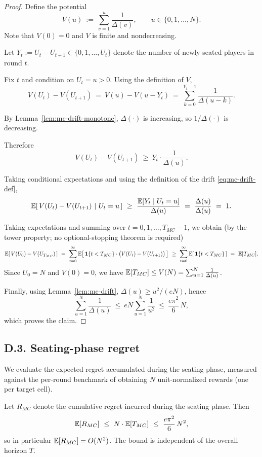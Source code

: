 \begin{proof}
Define the potential
\[
V(u)\ :=\ \sum_{v=1}^{u}\frac{1}{\Delta(v)},\qquad u\in\{0,1,\dots,N\}.
\]
Note that $V(0)=0$ and $V$ is finite and nondecreasing.

Let $Y_t:=U_t-U_{t+1}\in\{0,1,\dots,U_t\}$ denote the number of newly seated players in round $t$.

Fix $t$ and condition on $U_t=u>0$. Using the definition of $V$,
\[
V(U_t)-V(U_{t+1})\ =\ V(u)-V(u-Y_t)\ =\ \sum_{k=0}^{Y_t-1}\frac{1}{\Delta(u-k)}.
\]

By Lemma~\ref{lem:mc-drift-monotone}, $\Delta(\cdot)$ is increasing, so $1/\Delta(\cdot)$ is decreasing. 

Therefore
\[
V(U_t)-V(U_{t+1})\ \ge\ Y_t\cdot \frac{1}{\Delta(u)}.
\]

Taking conditional expectations and using the definition of the drift \eqref{eq:mc-drift-def},
\[
\EE\!\left[\, V(U_t)-V(U_{t+1}) \ \middle|\ U_t=u \,\right]
\ \ge\ \frac{\EE[Y_t\mid U_t=u]}{\Delta(u)}\ =\ \frac{\Delta(u)}{\Delta(u)}\ =\ 1.
\]

Taking expectations and summing over $t=0,1,\dots,T_{MC}-1$, we obtain (by the tower property; no optional-stopping theorem is required)
\[
\mathbb{E}\!\left[\,V(U_0)-V(U_{T_{MC}})\,\right]
\ =\ \sum_{t=0}^{\infty} \mathbb{E}\!\left[\,\mathbf 1\{t<T_{MC}\}\cdot \bigl(V(U_t)-V(U_{t+1})\bigr)\,\right]
\ \ge\ \sum_{t=0}^{\infty} \mathbb{E}\!\left[\,\mathbf 1\{t<T_{MC}\}\,\right]
\ =\ \mathbb{E}[T_{MC}].
\]
Since $U_0=N$ and $V(0)=0$, we have $\mathbb{E}[T_{MC}]\le V(N)=\sum_{u=1}^{N}\frac{1}{\Delta(u)}$.

Finally, using Lemma~\ref{lem:mc-drift}, $\Delta(u)\ge u^2/(eN)$, hence
\[
\sum_{u=1}^{N}\frac{1}{\Delta(u)}\ \le\ eN \sum_{u=1}^{N}\frac{1}{u^2}\ \le\ \frac{e\pi^2}{6}\,N,
\]
which proves the claim.
\end{proof}

\subsection*{D.3.\; Seating-phase regret}

We evaluate the expected regret accumulated during the seating phase, measured against the per-round benchmark of obtaining $N$ unit-normalized rewards (one per target cell). 

\begin{corollary}
\label{cor:mc-regret}
Let $R_{MC}$ denote the cumulative regret incurred during the seating phase.
Then
\[
\EE[R_{MC}]\ \le\ N \cdot \EE[T_{MC}]\ \le\ \frac{e\pi^2}{6}\,N^2,
\]
so in particular $\mathbb{E}[R_{MC}]=O(N^2)$. The bound is independent of the overall horizon $T$.
\end{corollary}

